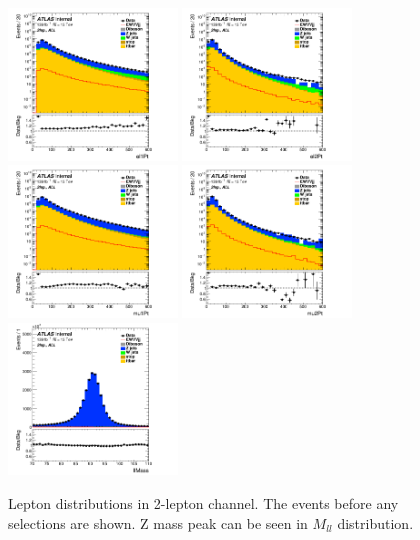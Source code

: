 \begin{figure}[H]
    \centering
    \includegraphics[width=0.4\textwidth]{figures/2lep/dataMC/C_0ptag1pfat0pjet_0ptv_ALL_el1Pt_Log}
    \includegraphics[width=0.4\textwidth]{figures/2lep/dataMC/C_0ptag1pfat0pjet_0ptv_ALL_el2Pt_Log} 
    \includegraphics[width=0.4\textwidth]{figures/2lep/dataMC/C_0ptag1pfat0pjet_0ptv_ALL_mu1Pt_Log}
    \includegraphics[width=0.4\textwidth]{figures/2lep/dataMC/C_0ptag1pfat0pjet_0ptv_ALL_mu2Pt_Log} 
    \includegraphics[width=0.4\textwidth]{figures/2lep/dataMC/C_0ptag1pfat0pjet_0ptv_ALL_llMass_Lin}
    \caption{Lepton distributions in 2-lepton channel. The events before any selections are shown. Z mass peak can be seen in $M_{ll}$ distribution.}
    \label{fig:2lepLeptons}
\end{figure}

